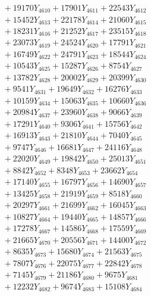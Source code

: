 \documentclass[a4paper,10pt]{article}
\begin{document}
{\begin{align}
&\;  + 19170 Y_{4610} + 17901 Y_{4611} + 22543 Y_{4612} \\[0.3ex]
&\;  + 15452 Y_{4613} + 22178 Y_{4614} + 21060 Y_{4615} \\[0.3ex]
&\;  + 18231 Y_{4616} + 21252 Y_{4617} + 23515 Y_{4618} \\[0.5ex]\allowbreak
&\;  + 23073 Y_{4619} + 24524 Y_{4620} + 17791 Y_{4621} \\[0.3ex]
&\;  + 16749 Y_{4622} + 24791 Y_{4623} + 18544 Y_{4624} \\[0.3ex]
&\;  + 10543 Y_{4625} + 15287 Y_{4626} + 8754 Y_{4627} \\[0.3ex]
&\;  + 13782 Y_{4628} + 20002 Y_{4629} + 20399 Y_{4630} \\[0.3ex]
&\;  + 9541 Y_{4631} + 19649 Y_{4632} + 16276 Y_{4633} \\[0.3ex]
&\;  + 10159 Y_{4634} + 15063 Y_{4635} + 10660 Y_{4636} \\[0.3ex]
&\;  + 20984 Y_{4637} + 23960 Y_{4638} + 9066 Y_{4639} \\[0.3ex]
&\;  + 17291 Y_{4640} + 9306 Y_{4641} + 15756 Y_{4642} \\[0.3ex]
&\;  + 16913 Y_{4643} + 21810 Y_{4644} + 7040 Y_{4645} \\[0.3ex]
&\;  + 9747 Y_{4646} + 16681 Y_{4647} + 24116 Y_{4648} \\[0.5ex]\allowbreak
&\;  + 22020 Y_{4649} + 19842 Y_{4650} + 25013 Y_{4651} \\[0.3ex]
&\;  + 8842 Y_{4652} + 8348 Y_{4653} + 23662 Y_{4654} \\[0.3ex]
&\;  + 17140 Y_{4655} + 16797 Y_{4656} + 14690 Y_{4657} \\[0.3ex]
&\;  + 13425 Y_{4658} + 21919 Y_{4659} + 8518 Y_{4660} \\[0.3ex]
&\;  + 20297 Y_{4661} + 21699 Y_{4662} + 16045 Y_{4663} \\[0.3ex]
&\;  + 10827 Y_{4664} + 19440 Y_{4665} + 14857 Y_{4666} \\[0.3ex]
&\;  + 17278 Y_{4667} + 14586 Y_{4668} + 17559 Y_{4669} \\[0.3ex]
&\;  + 21665 Y_{4670} + 20556 Y_{4671} + 14400 Y_{4672} \\[0.3ex]
&\;  + 8635 Y_{4673} + 15680 Y_{4674} + 21563 Y_{4675} \\[0.3ex]
&\;  + 7807 Y_{4676} + 22075 Y_{4677} + 22842 Y_{4678} \\[0.5ex]\allowbreak
&\;  + 7145 Y_{4679} + 21186 Y_{4680} + 9675 Y_{4681} \\[0.3ex]
&\;  + 12232 Y_{4682} + 9674 Y_{4683} + 15108 Y_{4684} \\[0.3ex]

\end{align}}
\end{document}
